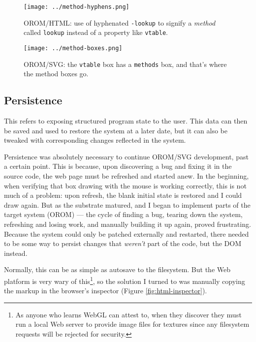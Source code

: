 \begin{figure}[h]
  \centering
  \texttt{[image: ../method-hyphens.png]}
  \caption{OROM/HTML: use of hyphenated \texttt{-lookup} to signify a \emph{method} called
           \texttt{lookup} instead of a property like \texttt{vtable}. \label{fig:method-hyphens}}
\end{figure}

\begin{figure}[h]
  \centering
  \texttt{[image: ../method-boxes.png]}
  \caption{OROM/SVG: the \texttt{vtable} box has a \texttt{methods} box, and that's where the method boxes go. \label{fig:method-boxes}}
\end{figure}

\hypertarget{persistence}{%
\subsection{Persistence}\label{persistence}}

This refers to exposing structured program state to the user. This data
can then be saved and used to restore the system at a later date, but it
can also be tweaked with corresponding changes reflected in the system.

Persistence was absolutely necessary to continue OROM/SVG development,
past a certain point. This is because, upon discovering a bug and fixing
it in the source code, the web page must be refreshed and started anew.
In the beginning, when verifying that box drawing with the mouse is
working correctly, this is not much of a problem: upon refresh, the
blank initial state is restored and I could draw again. But as the
substrate matured, and I began to implement parts of the target system
(OROM) --- the cycle of finding a bug, tearing down the system,
refreshing and losing work, and manually building it up again, proved
frustrating. Because the system could only be patched externally and
restarted, there needed to be some way to persist changes that
\emph{weren't} part of the code, but the DOM instead.

Normally, this can be as simple as autosave to the filesystem. But the
Web platform is very wary of this\footnote{As anyone who learns WebGL
  can attest to, when they discover they must run a local Web server to
  provide image files for textures since any filesystem requests will be
  rejected for security.}, so the solution I turned to was manually
copying the markup in the browser's inspector (Figure
\ref{fig:html-inspector}).

